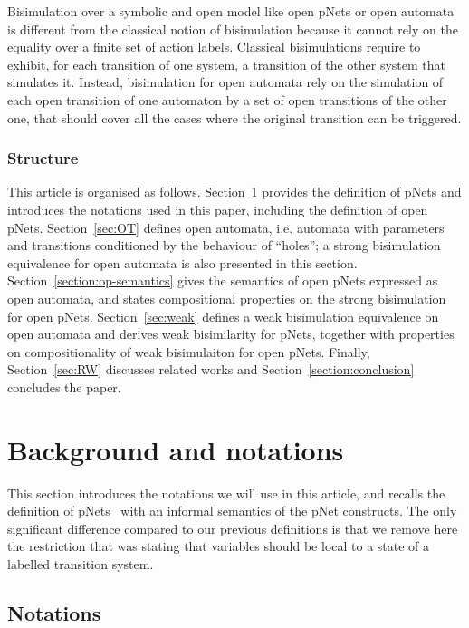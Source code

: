 \documentclass{lmcs}
\begin{document}
Bisimulation over a symbolic and open model like open pNets or open automata is  different from the classical notion of bisimulation because it cannot rely on the equality over a finite set of action labels. Classical bisimulations require to exhibit, for each transition of one system, a transition of the other system that simulates it. Instead, bisimulation for open automata  rely on the simulation of each open transition of one automaton by a set of open transitions of the other one, that should cover all the 
cases where the original transition can be triggered.



\subsubsection*{Structure}
This article is organised as follows. Section~\ref{sec:notations}
provides the definition of pNets and introduces the notations used in
this paper, including the definition of open pNets. 
Section~\ref{sec:OT} defines open automata, i.e. automata
with parameters and transitions conditioned by the behaviour of
``holes''; a strong bisimulation equivalence for open automata is also
presented in this section. 
Section~\ref{section:op-semantics} gives
the semantics of open pNets expressed as open automata, and states
compositional properties on the strong bisimulation for open
pNets. 
Section~\ref{sec:weak} defines a weak bisimulation
equivalence on open automata and derives weak bisimilarity for pNets,
together with properties on compositionality of weak bisimulaiton for
open pNets. 
Finally, Section~\ref{sec:RW} discusses related works and Section~\ref{section:conclusion} concludes the
paper. 


\section{Background and notations}\label{sec:notations}
This section introduces the notations we will use in this article, and  recalls the definition of pNets~\cite{henrio:Forte2016} with an informal semantics  of the pNet constructs. The only significant difference compared to our previous definitions is that we remove here the restriction that was stating that variables should be local to a state of a labelled transition system.




\subsection{Notations}
\end{document}
